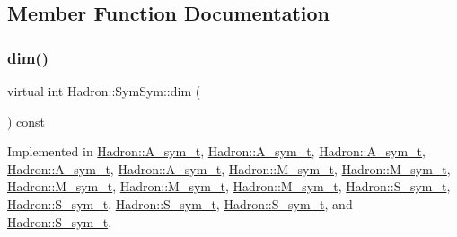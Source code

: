 \subsection{Member Function Documentation}
\mbox{\label{structHadron_1_1SymSym_ae57780f41b9f6c03c6056eed3677bd48}} 
\subsubsection{\texorpdfstring{dim()}{dim()}\hspace{0.1cm}{\footnotesize\ttfamily [1/2]}}
{\footnotesize\ttfamily virtual int Hadron\+::\+Sym\+Sym\+::dim (\begin{DoxyParamCaption}{ }\end{DoxyParamCaption}) const\hspace{0.3cm}{\ttfamily [pure virtual]}}



Implemented in \mbox{\hyperlink{structHadron_1_1A__sym__t_a57e9460ee09050859f969d1f0cae0e92}{Hadron\+::\+A\+\_\+sym\+\_\+t}}, \mbox{\hyperlink{structHadron_1_1A__sym__t_a57e9460ee09050859f969d1f0cae0e92}{Hadron\+::\+A\+\_\+sym\+\_\+t}}, \mbox{\hyperlink{structHadron_1_1A__sym__t_a57e9460ee09050859f969d1f0cae0e92}{Hadron\+::\+A\+\_\+sym\+\_\+t}}, \mbox{\hyperlink{structHadron_1_1A__sym__t_a57e9460ee09050859f969d1f0cae0e92}{Hadron\+::\+A\+\_\+sym\+\_\+t}}, \mbox{\hyperlink{structHadron_1_1A__sym__t_a57e9460ee09050859f969d1f0cae0e92}{Hadron\+::\+A\+\_\+sym\+\_\+t}}, \mbox{\hyperlink{structHadron_1_1M__sym__t_a9ee8ba6fd6c2220231052690b2995ed5}{Hadron\+::\+M\+\_\+sym\+\_\+t}}, \mbox{\hyperlink{structHadron_1_1M__sym__t_a9ee8ba6fd6c2220231052690b2995ed5}{Hadron\+::\+M\+\_\+sym\+\_\+t}}, \mbox{\hyperlink{structHadron_1_1M__sym__t_a9ee8ba6fd6c2220231052690b2995ed5}{Hadron\+::\+M\+\_\+sym\+\_\+t}}, \mbox{\hyperlink{structHadron_1_1M__sym__t_a9ee8ba6fd6c2220231052690b2995ed5}{Hadron\+::\+M\+\_\+sym\+\_\+t}}, \mbox{\hyperlink{structHadron_1_1M__sym__t_a9ee8ba6fd6c2220231052690b2995ed5}{Hadron\+::\+M\+\_\+sym\+\_\+t}}, \mbox{\hyperlink{structHadron_1_1S__sym__t_ae8b1558dc91f46f5d78de03f1e587dc0}{Hadron\+::\+S\+\_\+sym\+\_\+t}}, \mbox{\hyperlink{structHadron_1_1S__sym__t_ae8b1558dc91f46f5d78de03f1e587dc0}{Hadron\+::\+S\+\_\+sym\+\_\+t}}, \mbox{\hyperlink{structHadron_1_1S__sym__t_ae8b1558dc91f46f5d78de03f1e587dc0}{Hadron\+::\+S\+\_\+sym\+\_\+t}}, \mbox{\hyperlink{structHadron_1_1S__sym__t_ae8b1558dc91f46f5d78de03f1e587dc0}{Hadron\+::\+S\+\_\+sym\+\_\+t}}, and \mbox{\hyperlink{structHadron_1_1S__sym__t_ae8b1558dc91f46f5d78de03f1e587dc0}{Hadron\+::\+S\+\_\+sym\+\_\+t}}.

